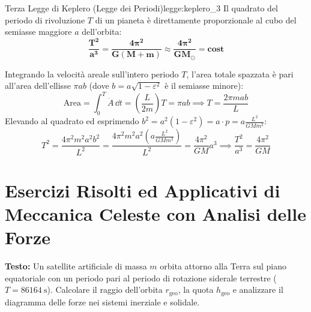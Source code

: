 \begin{legge}{Terza Legge di Keplero (Legge dei Periodi)}{legge:keplero_3}
Il quadrato del periodo di rivoluzione $T$ di un pianeta è direttamente proporzionale al cubo del semiasse maggiore $a$ dell'orbita:
\begin{equation}
    \mathbf{\frac{T^2}{a^3} = \frac{4\pi^2}{G(M + m)} \approx \frac{4\pi^2}{G M_{\odot}} = \text{cost}}
    \label{eq:keplero_3}
\end{equation}
\end{legge}

\begin{dimostrazione}
Integrando la velocità areale sull'intero periodo $T$, l'area totale spazzata è pari all'area dell'ellisse $\pi a b$ (dove $b = a\sqrt{1-\varepsilon^2}$ è il semiasse minore):
\begin{equation}
    \text{Area} = \int_0^T \dot{A}\,\dd t = \left(\frac{L}{2m}\right)T = \pi a b \implies T = \frac{2\pi m a b}{L}
\end{equation}
Elevando al quadrato ed esprimendo $b^2 = a^2(1-\varepsilon^2) = a \cdot p = a \frac{L^2}{G M m^2}$:
\begin{equation}
    T^2 = \frac{4\pi^2 m^2 a^2 b^2}{L^2} = \frac{4\pi^2 m^2 a^2 \left(a \frac{L^2}{G M m^2}\right)}{L^2} = \frac{4\pi^2}{G M} a^3 \implies \frac{T^2}{a^3} = \frac{4\pi^2}{G M}
\end{equation}
\end{dimostrazione}

\section{Esercizi Risolti ed Applicativi di Meccanica Celeste con Analisi delle Forze}
\label{sec:esercizi_gravitazione}

\begin{esercizio}
\textbf{Testo:}
Un satellite artificiale di massa $m$ orbita attorno alla Terra sul piano equatoriale con un periodo pari al periodo di rotazione siderale terrestre ($T = \SI{86164}{\second}$). Calcolare il raggio dell'orbita $r_{\text{geo}}$, la quota $h_{\text{geo}}$ e analizzare il diagramma delle forze nei sistemi inerziale e solidale.
\end{esercizio}

